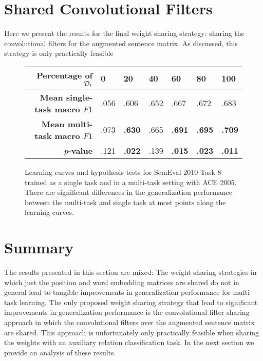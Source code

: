 \section{Shared Convolutional Filters}
Here we present the results for the final weight sharing strategy: sharing the convolutional filters for the augmented sentence matrix. As discussed, this strategy is only practically feasible 
\begin{figure}[h]
	\centering
	
		\vspace*{1cm}
	
	\begin{tabular}{r | l | l | l | l | l | l}
		\textbf{Percentage of $\mathcal{D}_t$} & 0 & 20 & 40 & 60 & 80 & 100 \\  \hline
		\textbf{Mean single-task macro $F1$} & .056 & .606 & .652 & .667 & .672 & .683\\
		\textbf{Mean multi-task macro $F1$} & .073 & \textbf{.630} & .665 & \textbf{.691} & \textbf{.695} & \textbf{.709}\\
		$p$\textbf{-value} & .121 & \textbf{.022} & .139 & \textbf{.015} & \textbf{.023} &\textbf{.011}
	\end{tabular}
	\caption{Learning curves and hypothesis tests for SemEval 2010 Task 8 trained as a single task and in a multi-task setting with ACE 2005. There are significant differences in the generalization performance between the multi-task and single task at most points along the learning curves.}
\end{figure}



\section{Summary}
The results presented in this section are mixed: The weight sharing strategies in which just the position and word embedding matrices are shared do not in general lead to tangible improvements in generalization performance for multi-task learning. The only proposed weight sharing strategy that lead to significant improvements in generalization performance is the convolutional filter sharing approach in which the convolutional filters over the augmented sentence matrix are shared. This approach is unfortunately only practically feasible when sharing the weights with an auxiliary relation classification task. In the next section we provide an analysis of these results.